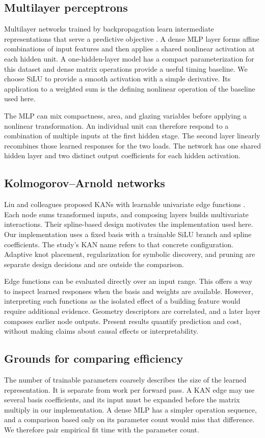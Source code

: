 \documentclass[11pt,twocolumn,letterpaper]{article}
\begin{document}
\subsection{Multilayer perceptrons}
Multilayer networks trained by backpropagation learn intermediate representations that serve a predictive objective \cite{backprop}. A dense MLP layer forms affine combinations of input features and then applies a shared nonlinear activation at each hidden unit. A one-hidden-layer model has a compact parameterization for this dataset and dense matrix operations provide a useful timing baseline. We choose SiLU to provide a smooth activation with a simple derivative. Its application to a weighted sum is the defining nonlinear operation of the baseline used here.

The MLP can mix compactness, area, and glazing variables before applying a nonlinear transformation. An individual unit can therefore respond to a combination of multiple inputs at the first hidden stage. The second layer linearly recombines those learned responses for the two loads. The network has one shared hidden layer and two distinct output coefficients for each hidden activation.

\subsection{Kolmogorov--Arnold networks}
Liu and colleagues proposed KANs with learnable univariate edge functions \cite{liu}. Each node sums transformed inputs, and composing layers builds multivariate interactions. Their spline-based design motivates the implementation used here. Our implementation uses a fixed basis with a trainable SiLU branch and spline coefficients. The study's KAN name refers to that concrete configuration. Adaptive knot placement, regularization for symbolic discovery, and pruning are separate design decisions and are outside the comparison.

Edge functions can be evaluated directly over an input range. This offers a way to inspect learned responses when the basis and weights are available. However, interpreting such functions as the isolated effect of a building feature would require additional evidence. Geometry descriptors are correlated, and a later layer composes earlier node outputs. Present results quantify prediction and cost, without making claims about causal effects or interpretability.

\subsection{Grounds for comparing efficiency}
The number of trainable parameters coarsely describes the size of the learned representation. It is separate from work per forward pass. A KAN edge may use several basis coefficients, and its input must be expanded before the matrix multiply in our implementation. A dense MLP has a simpler operation sequence, and a comparison based only on its parameter count would miss that difference. We therefore pair empirical fit time with the parameter count.
\end{document}
